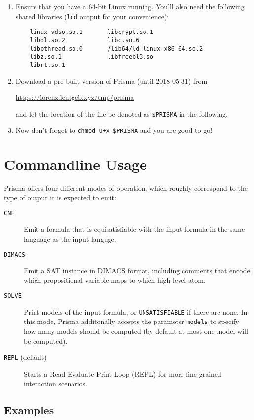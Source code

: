 \documentclass{llncs}
\begin{document}
\begin{enumerate}
\item{Ensure that you have a 64-bit Linux running. You'll also need the following shared libraries (\texttt{ldd} output for your convenience):
	\begin{verbatim}
	linux-vdso.so.1       libcrypt.so.1
	libdl.so.2            libc.so.6
	libpthread.so.0       /lib64/ld-linux-x86-64.so.2
	libz.so.1             libfreebl3.so
	librt.so.1
	\end{verbatim}}
	\item{Download a pre-built version of Prisma (until 2018-05-31) from
	\begin{center}
	\url{https://lorenz.leutgeb.xyz/tmp/prisma}
	\end{center} and let the location of the file be denoted as \texttt{\$PRISMA} in the following.}
	\item{Now don't forget to \texttt{chmod u+x \$PRISMA} and you are good to go!}
\end{enumerate}

\section{Commandline Usage}
\label{sec:usage}

Prisma offers four different modes of operation, which roughly correspond to the type of output it is expected to emit:

\begin{description}
	\item[\texttt{CNF}]{Emit a formula that is equisatisfiable with the input formula in the same language as the input languge.}
	\item[\texttt{DIMACS}]{Emit a SAT instance in DIMACS format, including comments that encode which propositional variable maps to which high-level atom.}
	\item[\texttt{SOLVE}]{Print models of the input formula, or \texttt{UNSATISFIABLE} if there are none. In this mode, Prisma additonally accepts the parameter \texttt{models} to specify how many models should be computed (by default at most one model will be computed).}
	\item[\texttt{REPL} \textnormal{(default)}]{Starts a Read Evaluate Print Loop (REPL) for more fine-grained interaction scenarios.}
\end{description}

\subsection{Examples}
\end{document}
